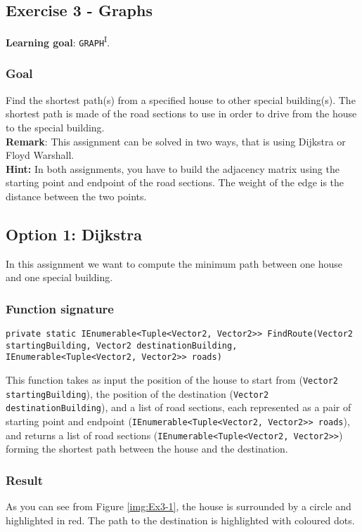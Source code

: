 \newpage
\subsection*{Exercise 3 - Graphs}
\textbf{Learning goal}: \texttt{GRAPH}\textsuperscript{I}. \\

\subsubsection*{Goal}
Find the shortest path(s) from a specified house to other special building(s). The shortest path is made of the road sections to use in order to drive from the house to the special building.\\
\textbf{Remark}: This assignment can be solved in two ways, that is using Dijkstra or Floyd Warshall.\\
\textbf{Hint:} In both assignments, you have to build the adjacency matrix using the starting point and endpoint of the road sections. The weight of the edge is the distance between the two points.

\subsection*{Option 1: Dijkstra}
In this assignment we want to compute the minimum path between one house and one special building. 

\subsubsection*{Function signature} 
\begin{lstlisting}
private static IEnumerable<Tuple<Vector2, Vector2>> FindRoute(Vector2 startingBuilding, Vector2 destinationBuilding, IEnumerable<Tuple<Vector2, Vector2>> roads)
\end{lstlisting}

\noindent
This function takes as input the position of the house to start from (\texttt{Vector2 startingBuilding}), the position of the destination (\texttt{Vector2 destinationBuilding}), and a list of road sections, each represented as a pair of starting point and endpoint (\texttt{IEnumerable<Tuple<Vector2, Vector2>> roads}), and returns a list of road sections (\texttt{IEnumerable<Tuple<Vector2, Vector2>>}) forming the shortest path between the house and the destination.\\

\subsubsection*{Result} 
As you can see from Figure \ref{img:Ex3-1}, the house is surrounded by a circle and highlighted in red. The path to the destination is highlighted with coloured dots.

